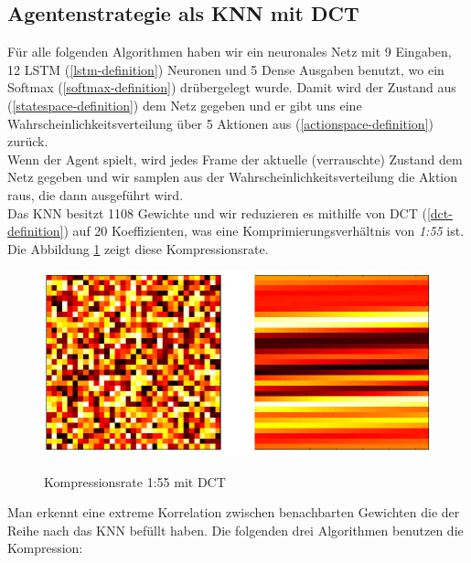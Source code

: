         \subsection{Agentenstrategie als KNN mit DCT} \label{knn-dct-impl}
        Für alle folgenden Algorithmen haben wir ein neuronales Netz mit 9 Eingaben, 12 LSTM (\ref{lstm-definition}) Neuronen und 5 Dense Ausgaben benutzt, wo ein Softmax (\ref{softmax-definition}) drübergelegt wurde. Damit wird der Zustand aus (\ref{statespace-definition}) dem Netz gegeben und er gibt uns eine Wahrscheinlichkeitsverteilung über 5 Aktionen aus (\ref{actionspace-definition}) zurück.\\[2mm]
        \noindent
        Wenn der Agent spielt, wird jedes Frame der aktuelle (verrauschte) Zustand dem Netz gegeben und wir samplen aus der Wahrscheinlichkeitsverteilung die Aktion raus, die dann ausgeführt wird. \\[2mm]
        \noindent
        Das KNN besitzt 1108 Gewichte und wir reduzieren es mithilfe von DCT (\ref{dct-definition}) auf 20 Koeffizienten, was eine Komprimierungsverhältnis von \textit{1:55} ist. Die Abbildung \ref{fig:dct-my-case} zeigt diese Kompressionsrate.\\

        \begin{figure}[H]
            \begin{center}
                \includegraphics[scale=0.35]{../pictures/DCT-my-case-cropped.png}\\
                \caption{Kompressionsrate 1:55 mit DCT}\label{fig:dct-my-case}
            \end{center}
        \end{figure}

        \noindent
        Man erkennt eine extreme Korrelation zwischen benachbarten Gewichten die der Reihe nach das KNN befüllt haben. Die folgenden drei Algorithmen benutzen die Kompression:

